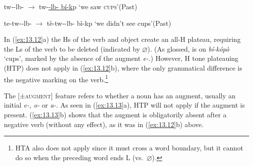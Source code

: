 \documentclass[output=paper]{langsci/langscibook}
\begin{document}
\ea\label{ex:13.12}
    \ea tw--lb-  ${\rightarrow}$
        tw-\underline{-lb-
        bí-k}p  ‘we saw \textsc{cups}’\hfill(Past)
        \vspace{.75\baselineskip}
    \ex te-tw--lb-  ${\rightarrow}$
        tè-tw--lb-  bì-kp
        ‘we didn’t see cups’\hfill(Past)
        \vspace{.75\baselineskip}
    \z
\z
In (\ref{ex:13.12}a) the Hs of the verb and object create an all-H plateau,
requiring the Ls of the verb to be deleted (indicated by $\varnothing$). (As
glossed, 
is on \emph{bí-kópò} ‘cups’, marked by the absence of the augment \emph{e-.})
However, H tone plateauing (\gls{HTP}) does not apply in
(\ref{ex:13.12}b), where the only grammatical difference is the negative
marking on the verb.\footnote{\gls{HTA} also does not apply since it must cross
a word boundary, but it cannot do so when the preceding word ends L (vs.\ $\varnothing$).}

The [±\textsc{augment}] feature refers to whether a noun has an augment,
usually an initial \emph{e-, o-} or \emph{a-}. As seen in
(\ref{ex:13.13}a), \gls{HTP} will not apply if the augment is present.
(\ref{ex:13.13}b) shows that the augment is obligatorily absent after a
negative verb (without any  effect), as it was in (\ref{ex:13.12}b)
above.
\end{document}
